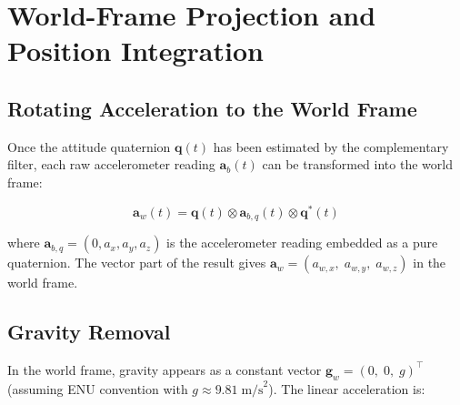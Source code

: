 \section{World-Frame Projection and Position Integration}
\label{sec:projection}


\subsection{Rotating Acceleration to the World Frame}
\label{sec:proj:rotation}

Once the attitude quaternion $\mathbf{q}(t)$ has been estimated by the
complementary filter, each raw accelerometer reading
$\mathbf{a}_b(t)$ can be transformed into the world frame:

\begin{equation}
  \mathbf{a}_w(t) = \mathbf{q}(t) \otimes \mathbf{a}_{b,q}(t)
                    \otimes \mathbf{q}^*(t)
  \label{eq:a_world}
\end{equation}

\noindent where $\mathbf{a}_{b,q} = (0, a_x, a_y, a_z)$ is the accelerometer
reading embedded as a pure quaternion. The vector part of the result gives
$\mathbf{a}_w = (a_{w,x},\; a_{w,y},\; a_{w,z})$ in the world frame.

%

\subsection{Gravity Removal}
\label{sec:proj:gravity}

In the world frame, gravity appears as a constant vector
$\mathbf{g}_w = (0,\; 0,\; g)^\top$ (assuming ENU convention with
$g \approx 9.81\;\text{m/s}^2$). The linear acceleration is:

